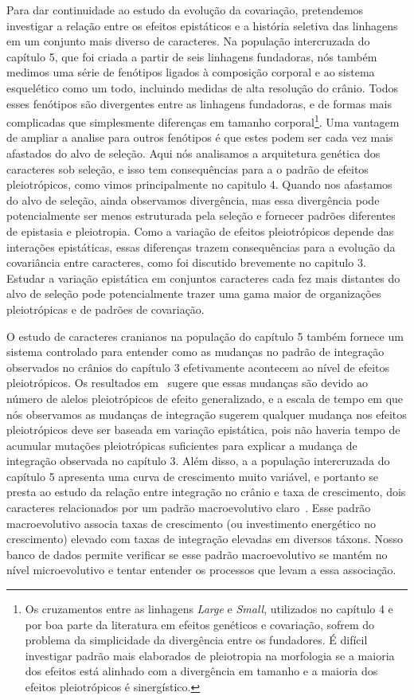 \begin{refsection}
Para dar continuidade ao estudo da evolução da covariação,
pretendemos investigar a relação entre os efeitos epistáticos e a história
seletiva das linhagens em um conjunto mais diverso de caracteres. Na população
intercruzada do capítulo 5, que foi criada a partir de seis linhagens
fundadoras, nós também medimos uma série de fenótipos ligados à composição
corporal e ao sistema esquelético como um todo, incluindo medidas de alta
resolução do crânio. Todos esses fenótipos são divergentes entre as linhagens
fundadoras, e de formas mais complicadas que simplesmente diferenças em
tamanho corporal\footnote{Os cruzamentos entre as linhagens \textit{Large} e
\textit{Small}, utilizados no capítulo 4 e por boa parte da literatura em
efeitos genéticos e covariação, sofrem do problema da simplicidade da
divergência entre os fundadores. É difícil investigar padrão mais elaborados
de pleiotropia na morfologia se a maioria dos efeitos está alinhado com a
divergência em tamanho e a maioria dos efeitos pleiotrópicos é sinergístico.}.
Uma vantagem de ampliar a analise para outros fenótipos é que estes podem ser
cada vez mais afastados do alvo de seleção. Aqui nós analisamos a arquitetura
genética dos caracteres sob seleção, e isso tem consequências para a o padrão
de efeitos pleiotrópicos, como vimos principalmente no capitulo 4. Quando nos
afastamos do alvo de seleção, ainda observamos divergência, mas essa
divergência pode potencialmente ser menos estruturada pela seleção e fornecer
padrões diferentes de epistasia e pleiotropia. Como a variação de efeitos
pleiotrópicos depende das interações epistáticas, essas diferenças trazem
consequências para a evolução da covariância entre caracteres, como foi
discutido brevemente no capitulo 3. Estudar a variação epistática em conjuntos
caracteres cada fez mais distantes do alvo de seleção pode potencialmente
trazer uma gama maior de organizações pleiotrópicas e de padrões de
covariação. 

O estudo de caracteres cranianos na população do capítulo 5 também fornece um
sistema controlado para entender como as mudanças no padrão de integração
observados no crânios do capítulo 3 efetivamente acontecem ao nível de efeitos
pleiotrópicos. Os resultados em~\textcite{Porto2016-qc} sugere que essas
mudanças são devido ao número de alelos pleiotrópicos de efeito generalizado,
e a escala de tempo em que nós observamos as mudanças de integração sugerem
qualquer mudança nos efeitos pleiotrópicos deve ser baseada em variação
epistática, pois não haveria tempo de acumular mutações pleiotrópicas
suficientes para explicar a mudança de integração observada no capítulo 3.
Além disso, a a população intercruzada do capítulo 5 apresenta uma curva de
crescimento muito variável, e portanto se presta ao estudo da relação entre
integração no crânio e taxa de crescimento, dois caracteres relacionados por
um padrão macroevolutivo claro~\parencite{Porto2013-dc}. Esse padrão
macroevolutivo associa taxas de crescimento (ou investimento energético no
crescimento) elevado com taxas de integração elevadas em diversos táxons.
Nosso banco de dados permite verificar se esse padrão macroevolutivo se mantém
no nível microevolutivo e tentar entender os processos que levam a essa
associação.



\end{refsection}
